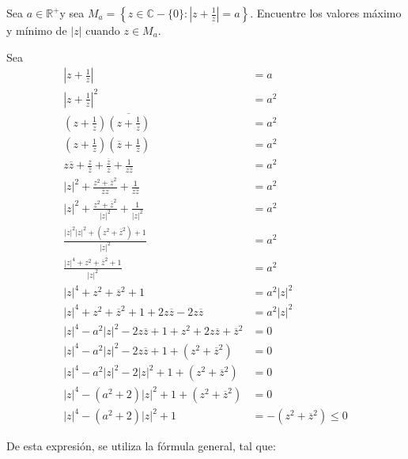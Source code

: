 \begin{problema}
    Sea $a \in \mathbb{R}^{+}$y sea $M_{a}=\left\{z \in \mathbb{C}-\{0\}:\left|z+\frac{1}{z}\right|=a\right\}$. Encuentre los valores máximo y mínimo de $|z|$ cuando $z \in M_{a}$.
    \begin{sol}
        Sea 
        \begin{align*}
            \left|z+\frac{1}{z}\right| &=a\\
            \left|z+\frac{1}{z}\right|^2 &=a^2\\
            \left(z+\frac{1}{z}\right)\overline{\left(z+\frac{1}{z}\right)} &=a^2\\
            \left(z+\frac{1}{z}\right)\left(\overline{z}+\frac{1}{\overline{z}}\right) &=a^2\\
            z\overline{z}+\frac{z}{\overline{z}}+\frac{\overline{z}}{z}+\frac{1}{z\overline{z}} &=a^2\\
            |z|^2+\frac{z^2+\overline{z}^2}{\overline{z}z}+\frac{1}{z\overline{z}} &=a^2\\
            |z|^2+\frac{z^2+\overline{z}^2}{|z|^2}+\frac{1}{|z|^2} &=a^2\\
            \frac{|z|^2|z|^2 +(z^2+\overline{z}^2) + 1}{|z|^2} &=a^2\\
            \frac{|z|^4 +z^2+\overline{z}^2 + 1}{|z|^2} &=a^2\\
            |z|^4 +z^2+\overline{z}^2 + 1 &= a^2|z|^2\\
            |z|^4 +z^2+\overline{z}^2 + 1 + 2z\overline{z} - 2z\overline{z} &= a^2|z|^2\\
            |z|^4 -a^2|z|^2 - 2z\overline{z} + 1 +z^2+ 2z\overline{z}+\overline{z}^2  &= 0\\
            |z|^4 -a^2|z|^2 - 2z\overline{z} + 1 + (z^2+\overline{z}^2)  &= 0\\
            |z|^4 -a^2|z|^2 - 2|z|^2 + 1 + (z^2+\overline{z}^2)  &= 0\\
            |z|^4 -(a^2+2)|z|^2 + 1 + (z^2+\overline{z}^2)  &= 0\\
            |z|^4 -(a^2+2)|z|^2 + 1   &= - (z^2+\overline{z}^2)\leq 0
        \end{align*}

        De esta expresión, se utiliza la fórmula general, tal que: 


\end{sol}
\end{problema}

